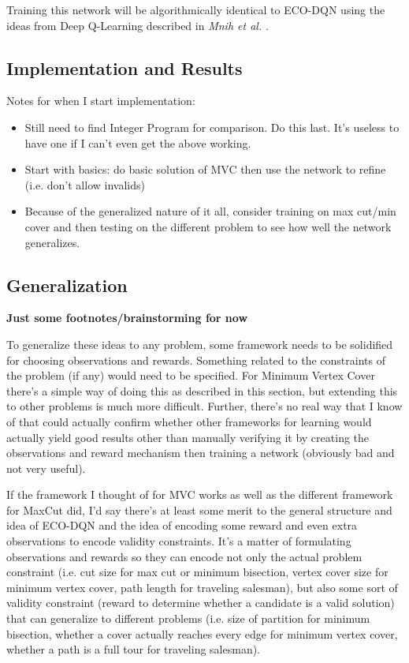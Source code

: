 \documentclass{article}
\begin{document}
Training this network will be algorithmically identical to ECO-DQN using the ideas from Deep Q-Learning described in \textit{Mnih et al.} \cite{deepmind_2015}.

\subsection{Implementation and Results}

Notes for when I start implementation: 

\begin{itemize}
    \item Still need to find Integer Program for comparison. Do this last. It's useless to have one if I can't even get the above working.
    \item Start with basics: do basic solution of MVC then use the network to refine (i.e. don't allow invalids)
    \item Because of the generalized nature of it all, consider training on max cut/min cover and then testing on the different problem to see how well the network generalizes. 
\end{itemize}

\subsection{Generalization}

\textbf{Just some footnotes/brainstorming for now}

To generalize these ideas to any problem, some framework needs to be solidified for choosing observations and rewards. Something related to the constraints of the problem (if any) would need to be specified. For Minimum Vertex Cover there's a simple way of doing this as described in this section, but extending this to other problems is much more difficult. Further, there's no real way that I know of that could actually confirm whether other frameworks for learning would actually yield good results other than manually verifying it by creating the observations and reward mechanism then training a network (obviously bad and not very useful).

If the framework I thought of for MVC works as well as the different framework for MaxCut did, I'd say there's at least some merit to the general structure and idea of ECO-DQN and the idea of encoding some reward and even extra observations to encode validity constraints. It's a matter of formulating observations and rewards so they can encode not only the actual problem constraint (i.e. cut size for max cut or minimum bisection, vertex cover size for minimum vertex cover, path length for traveling salesman), but also some sort of validity constraint (reward to determine whether a candidate is a valid solution) that can generalize to different problems (i.e. size of partition for minimum bisection, whether a cover actually reaches every edge for minimum vertex cover, whether a path is a full tour for traveling salesman).
\end{document}
